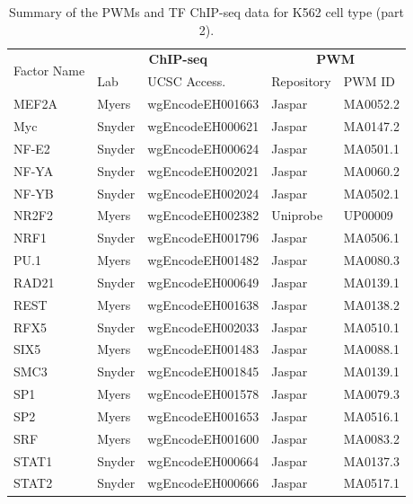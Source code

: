 \documentclass{bioinfo}
\begin{document}
\begin{table}[t]
\begin{center}
\caption{Summary of the PWMs and TF ChIP-seq data for K562 cell type (part 2).}
\label{tab:datapwm.k562.2}
    \renewcommand{\arraystretch}{1.2}
    \begin{tabular}{ l|ll|ll }
        \hline
        \multirow{2}{*}{Factor Name} & \multicolumn{2}{c|}{\textbf{ChIP-seq}} & \multicolumn{2}{c}{\textbf{PWM}} \\
                & Lab     & UCSC Access.     & Repository & PWM ID \\
        \hline
        MEF2A   & Myers   & wgEncodeEH001663 & Jaspar     & MA0052.2 \\
        Myc     & Snyder  & wgEncodeEH000621 & Jaspar     & MA0147.2 \\
        NF-E2    & Snyder  & wgEncodeEH000624 & Jaspar     & MA0501.1 \\
        NF-YA    & Snyder  & wgEncodeEH002021 & Jaspar     & MA0060.2 \\
        NF-YB    & Snyder  & wgEncodeEH002024 & Jaspar     & MA0502.1 \\
        NR2F2   & Myers   & wgEncodeEH002382 & Uniprobe   & UP00009  \\
        NRF1    & Snyder  & wgEncodeEH001796 & Jaspar     & MA0506.1 \\
        PU.1     & Myers   & wgEncodeEH001482 & Jaspar     & MA0080.3 \\
        RAD21   & Snyder  & wgEncodeEH000649 & Jaspar     & MA0139.1 \\
        REST    & Myers   & wgEncodeEH001638 & Jaspar     & MA0138.2 \\
        RFX5    & Snyder  & wgEncodeEH002033 & Jaspar     & MA0510.1 \\
        SIX5    & Myers   & wgEncodeEH001483 & Jaspar     & MA0088.1 \\
        SMC3    & Snyder  & wgEncodeEH001845 & Jaspar     & MA0139.1 \\
        SP1     & Myers   & wgEncodeEH001578 & Jaspar     & MA0079.3 \\
        SP2     & Myers   & wgEncodeEH001653 & Jaspar     & MA0516.1 \\
        SRF     & Myers   & wgEncodeEH001600 & Jaspar     & MA0083.2 \\
        STAT1   & Snyder  & wgEncodeEH000664 & Jaspar     & MA0137.3 \\
        STAT2   & Snyder  & wgEncodeEH000666 & Jaspar     & MA0517.1 \\

\end{tabular}
\end{center}
\end{table}
\end{document}
